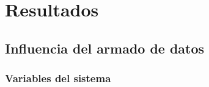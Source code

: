 \section{Resultados}
 
\subsection{Influencia del armado de datos}

\subsubsection{Variables del sistema}


